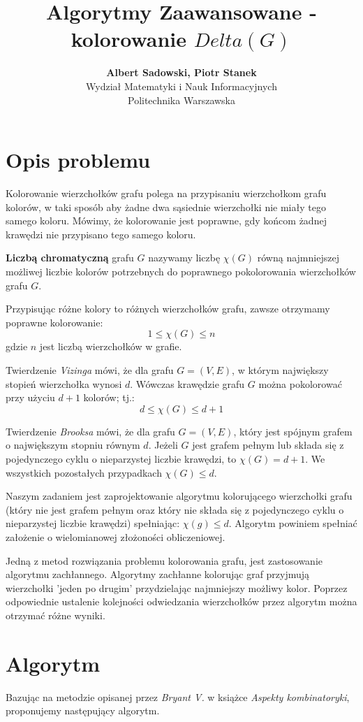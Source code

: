 \documentclass[a4paper]{article}
\title{\textbf{Algorytmy Zaawansowane - kolorowanie $Delta(G)$}}
\author{\textbf{Albert Sadowski, Piotr Stanek}\\
	Wydział Matematyki i Nauk Informacyjnych\\
	Politechnika Warszawska}
\begin{document}
	\maketitle
	\section{Opis problemu}
		Kolorowanie wierzchołków grafu polega na przypisaniu wierzchołkom grafu kolorów, w taki sposób aby żadne dwa sąsiednie wierzchołki nie miały tego samego koloru. Mówimy, że kolorowanie jest poprawne, gdy końcom żadnej krawędzi nie przypisano tego samego koloru.

	\textbf{Liczbą chromatyczną} grafu $G$ nazywamy liczbę $\chi (G)$ równą najmniejszej możliwej liczbie kolorów potrzebnych do poprawnego pokolorowania wierzchołków grafu $G$.

	Przypisując różne kolory to różnych wierzchołków grafu, zawsze otrzymamy poprawne kolorowanie:
	\begin{equation}
		1 \leq \chi (G) \leq n
	\end{equation}
	gdzie $n$ jest liczbą wierzchołków w grafie. 

	Twierdzenie \emph{Vizinga} mówi, że dla grafu $G=(V,E)$, w którym największy stopień wierzchołka wynosi $d$. Wówczas krawędzie grafu $G$ można pokolorować przy użyciu $d+1$ kolorów; tj.:
	\begin{equation}
		d \leq \chi (G) \leq d + 1
	\end{equation}

	Twierdzenie \emph{Brooksa} mówi, że dla grafu $G=(V,E)$, który jest spójnym grafem o największym stopniu równym $d$. Jeżeli $G$ jest grafem pełnym lub składa się z pojedynczego cyklu o nieparzystej liczbie krawędzi, to $\chi (G) = d + 1$. We wszystkich pozostałych przypadkach $\chi (G) \leq d$.

	Naszym zadaniem jest zaprojektowanie algorytmu kolorującego wierzchołki grafu (który nie jest grafem pełnym oraz który nie składa się z pojedynczego cyklu o nieparzystej liczbie krawędzi) spełniając: $\chi (g) \leq d$. Algorytm powiniem spełniać założenie o wielomianowej złożoności obliczeniowej.

	Jedną z metod rozwiązania problemu kolorowania grafu, jest zastosowanie algorytmu zachłannego. Algorytmy zachłanne kolorując graf przyjmują wierzchołki 'jeden po drugim' przydzielając najmniejszy możliwy kolor. Poprzez odpowiednie ustalenie kolejności odwiedzania wierzchołków przez algorytm można otrzymać różne wyniki.
	\section{Algorytm}
	Bazując na metodzie opisanej przez \textit{Bryant V.} w książce \textit{Aspekty kombinatoryki}, proponujemy następujący algorytm.
\end{document}
